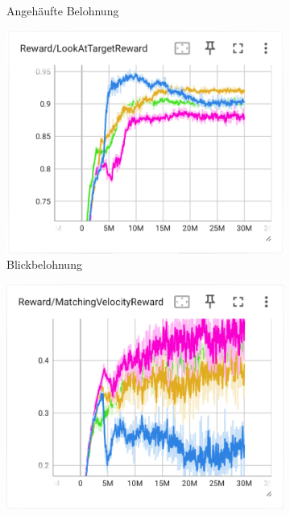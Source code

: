 \begin{figure}[H]
\begin{subfigure}{.49\textwidth}
      \caption{Angehäufte Belohnung}
      \label{fig:116_130_131_132_cumulative_reward}
    \end{subfigure}
     \begin{subfigure}{.49\textwidth}
      \centering  
      \includegraphics[width=\textwidth]{img/116_130_131_132_look_reward}
      \caption{Blickbelohnung}
      \label{fig:116_130_131_132_look_reward}
    \end{subfigure}
    \begin{subfigure}{.49\textwidth}
      \centering  
      \includegraphics[width=\textwidth]{img/116_130_131_132_vel_reward}

\end{subfigure}
\end{figure}
